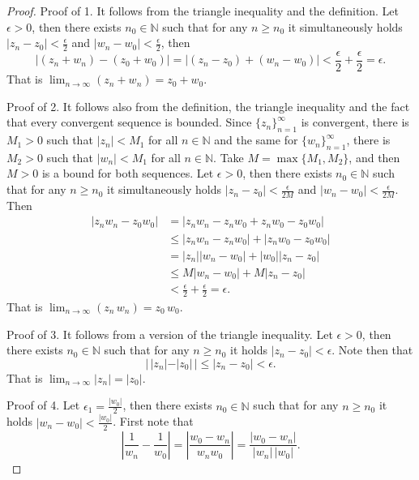 \documentclass{amsart}
\begin{document}
\begin{proof}
Proof of 1. It follows from the triangle inequality and the definition. Let \(\epsilon > 0\), then there exists \(n_0 \in \mathbb{N}\) such that for any \(n\geq n_0\) it simultaneously holds \(|z_n - z_0| < \frac{\epsilon}{2}\) and \(|w_n - w_0| < \frac{\epsilon}{2}\), then 
\[ |(z_n + w_n) - (z_0 + w_0) | = |(z_n - z_0) + (w_n - w_0) | < \frac{\epsilon}{2} + \frac{\epsilon}{2} = \epsilon. \]
That is \(\displaystyle\lim_{n\to\infty}(z_n + w_n) = z_0 + w_0\).

Proof of 2. It follows also from the definition, the triangle inequality and the fact that every convergent sequence is bounded. Since \(\{z_n\}_{n=1}^{\infty}\) is convergent, there is \(M_1>0\) such that \(|z_n| < M_1\) for all \(n\in\mathbb{N}\) and the same for \(\{w_n\}_{n=1}^{\infty}\), there is \(M_2 >0\) such that \(|w_n| < M_1\) for all \(n\in\mathbb{N}\). Take \(M = \max\{M_1,M_2\}\), and then \(M>0\) is a bound for both sequences.  Let \(\epsilon > 0\), then there exists \(n_0 \in \mathbb{N}\) such that for any \(n\geq n_0\) it simultaneously holds \(|z_n - z_0| < \frac{\epsilon}{2M}\) and \(|w_n - w_0| <  \frac{\epsilon}{2M}\). Then 
\begin{equation*} \begin{split} |z_n w_n - z_0 w_0 | &= | z_n w_n - z_n w_0 + z_n w_0 - z_0 w_0 | \\ & \leq | z_n w_n - z_n w_0 | + |z_n w_0 - z_0 w_0 | \\ &  = |z_n| | w_n - w_0| + |w_0| |z_n - z_0|  \\ & \leq M | w_n - w_0| + M |z_n - z_0| \\ & < \frac{\epsilon}{2} +  \frac{\epsilon}{2} = \epsilon. \end{split} \end{equation*}
That is \(\displaystyle\lim_{n\to\infty}(z_n \, w_n) = z_0 \, w_0\).

Proof of 3. It follows from a version of the triangle inequality. Let \(\epsilon > 0\), then there exists \(n_0 \in \mathbb{N}\) such that for any \(n\geq n_0\) it holds \(|z_n - z_0| < \epsilon\). Note then that
\[ |\, |z_n| - |z_0| \, | \leq |z_n - z_0| < \epsilon. \]
That is \(\displaystyle\lim_{n\to\infty}|z_n| = |z_0|\).

Proof of 4. Let \(\epsilon_1 = \frac{|w_0|}{2}\), then there exists \(n_0 \in \mathbb{N}\) such that for any \(n\geq n_0\) it holds \(|w_n - w_0| < \frac{|w_0|}{2}\). First note that
\[ \left| \frac{1}{w_n} - \frac{1}{w_0} \right| = |\frac{ w_0 - w_n}{w_n w_0} | = \frac{ |w_0 - w_n|}{|w_n |\, |w_0|}. \]


\end{proof}
\end{document}
